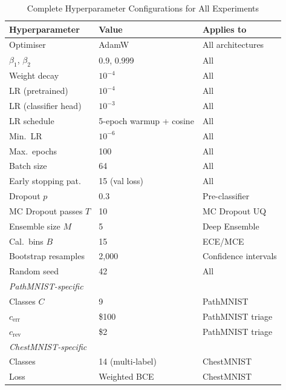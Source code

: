\documentclass[12pt,a4paper]{report}
\begin{document}
\begin{table}[H]
\footnotesize
\centering
\caption{Complete Hyperparameter Configurations for All Experiments}
\label{tab:app_hyperparams}
\begin{tabular}{lll}
\toprule
\textbf{Hyperparameter} & \textbf{Value} & \textbf{Applies to} \\
\midrule
Optimiser            & AdamW                  & All architectures \\
$\beta_1$, $\beta_2$ & 0.9, 0.999             & All \\
Weight decay         & $10^{-4}$              & All \\
LR (pretrained)      & $10^{-4}$              & All \\
LR (classifier head) & $10^{-3}$              & All \\
LR schedule          & 5-epoch warmup + cosine & All \\
Min.\ LR             & $10^{-6}$              & All \\
Max.\ epochs         & 100                    & All \\
Batch size           & 64                     & All \\
Early stopping pat.  & 15 (val loss)          & All \\
Dropout $p$          & 0.3                    & Pre-classifier \\
MC Dropout passes $T$& 10                     & MC Dropout UQ \\
Ensemble size $M$    & 5                      & Deep Ensemble \\
Cal.\ bins $B$       & 15                     & ECE/MCE \\
Bootstrap resamples  & 2{,}000                & Confidence intervals \\
Random seed          & 42                     & All \\
\midrule
\multicolumn{3}{l}{\textit{PathMNIST-specific}} \\
Classes $C$          & 9                      & PathMNIST \\
$c_{\text{err}}$     & \$100                  & PathMNIST triage \\
$c_{\text{rev}}$     & \$2                    & PathMNIST triage \\
\midrule
\multicolumn{3}{l}{\textit{ChestMNIST-specific}} \\
Classes              & 14 (multi-label)       & ChestMNIST \\
Loss                 & Weighted BCE           & ChestMNIST \\

\end{tabular}
\end{table}
\end{document}
